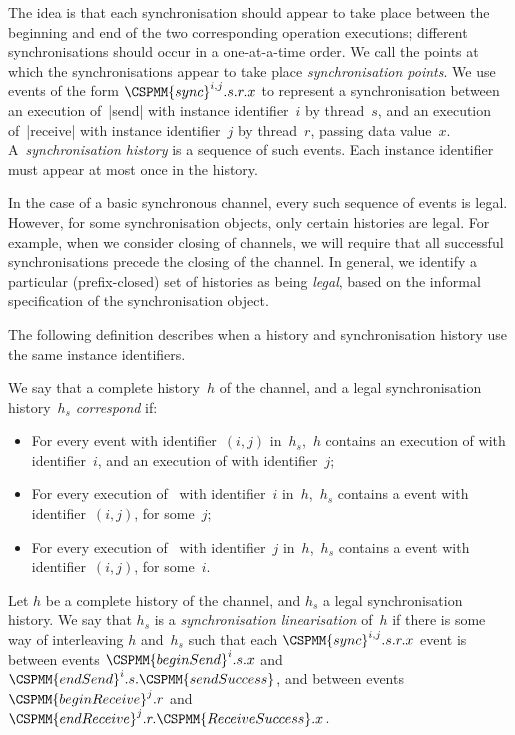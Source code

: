 The idea is that each synchronisation should appear to take place between the
beginning and end of the two corresponding operation executions; different
synchronisations should occur in a one-at-a-time order.  We call the points at
which the synchronisations appear to take place \emph{synchronisation points}.
%
We use events of the form $\CSPMM{sync}^{i,j}.s.r.x$ to represent a
synchronisation between an execution of~|send| with instance identifier~$i$ by
thread~$s$, and an execution of~|receive| with instance identifier~$j$ by
thread~$r$, passing data value~$x$.
%
A~\emph{synchronisation history} is a sequence of such  events.
Each instance identifier must appear at most once in the history. 

In the case of a basic synchronous channel, every such sequence of 
events is legal.  However, for some synchronisation objects, only certain
histories are legal.  For example, when we consider closing of channels, we
will require that all successful synchronisations precede the closing of the
channel.  In general, we identify a particular (prefix-closed) set of
histories as being \emph{legal}, based on the informal specification of the
synchronisation object.

The following definition describes when a history and synchronisation history
use the same instance identifiers.
\begin{definition}
We say that a complete history~$h$ of the channel, and a legal synchronisation
history~$h_s$ \emph{correspond} if:
%
\begin{itemize}
\item For every  event with identifier~$(i,j)$ in~$h_s$,\, $h$
  contains an execution of  with identifier~$i$, and an execution
  of  with identifier~$j$;

\item For every execution of~ with identifier~$i$ in~$h$,\, $h_s$
  contains a  event with identifier~$(i,j)$, for some~$j$;

\item For every execution of~ with identifier~$j$ in~$h$,\,
  $h_s$ contains a  event with identifier~$(i,j)$, for some~$i$.
\end{itemize}
\end{definition}

\begin{definition}
\label{def:sync-lin}
Let $h$ be a complete history of the channel, and $h_s$ a legal
synchronisation history.  We say that $h_s$ is a \emph{synchronisation
  linearisation} of~$h$ if there is some way of interleaving $h$ and~$h_s$
such that each $\CSPMM{sync}^{i,j}.s.r.x$ event is between events
$\CSPMM{beginSend}^i.s.x$ and $\CSPMM{endSend}^i.s.\CSPMM{sendSuccess}$, and
between events $\CSPMM{beginReceive}^j.r$ and
$\CSPMM{endReceive}^j.r.\CSPMM{ReceiveSuccess}.x$. 
\end{definition}

